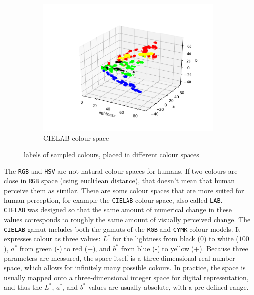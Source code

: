 \documentclass[12pt,a4paper]{article}
\begin{document}
\begin{center}
\begin{figure}[H]
\begin{subfigure}{.5\linewidth}
				\includegraphics[width=\linewidth]{images/lab_labels.png}
				\caption{CIELAB colour space}
			\end{subfigure}
			\caption{labels of sampled colours, placed in different colour spaces}
		\end{figure}
	\end{center}
	
	The \texttt{RGB} and \texttt{HSV} are not natural colour spaces for humans. If two colours are close in \texttt{RGB} space (using euclidean distance), that doesn't mean that human perceive them as similar. There are some colour spaces that are more suited for human perception, for example the \texttt{CIELAB} colour space, also called \texttt{LAB}. \\

	\texttt{CIELAB} was designed so that the same amount of numerical change in these values corresponds to roughly the same amount of visually perceived change. The  \texttt{CIELAB} gamut includes both the gamuts of the \texttt{RGB} and \texttt{CYMK} colour models. It expresses colour as three values: $L^*$ for the lightness from black ($0$) to white ($100$), $a^*$ from green (-) to red ($+$), and $b^*$ from blue (-) to yellow ($+$). Because three parameters are measured, the space itself is a three-dimensional real number space, which allows for infinitely many possible colours. In practice, the space is usually mapped onto a three-dimensional integer space for digital representation, and thus the $L^*$, $a^*$, and $b^*$ values are usually absolute, with a pre-defined range. \\
	
\end{document}
